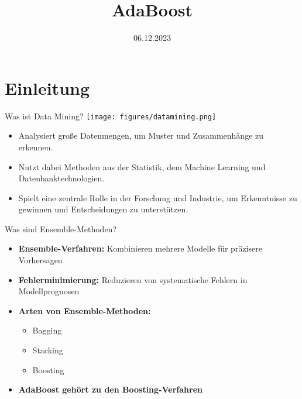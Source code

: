 \documentclass[hyperref={bookmarks=false},11pt,dvipsnames]{beamer}
\author[\presenternameshort]{\presentername}
\institute{Bergische Universität Wuppertal}
\title{AdaBoost}
\date{06.12.2023}
\def\englishlanguage{0}             %
\def\printpagenumbers{1}            %
\begin{document}
\maketitle


\let\rememberpagenumberswitch\printpagenumbers
\def\printpagenumbers{0}

\begin{frame}[t,noframenumbering]{\ifthenelse{\englishlanguage=1}{Outline}{Inhalt}}
	\tableofcontents
\end{frame}
\let\printpagenumbers\rememberpagenumberswitch


%
%

\section{Einleitung}

\begin{frame}[t]{Was ist Data Mining?}
	\texttt{[image: figures/datamining.png]}
	\begin{itemize}
		\item <1-> Analysiert große Datenmengen, um Muster und Zusammenhänge zu erkennen.
		\item <2-> Nutzt dabei Methoden aus der Statistik, dem Machine Learning und Datenbanktechnologien.
		\item <3-> Spielt eine zentrale Rolle in der Forschung und Industrie,
		      um Erkenntnisse zu gewinnen und
		      Entscheidungen zu unterstützen.
	\end{itemize}
\end{frame}
\begin{frame}[t]{Was sind Ensemble-Methoden?}
	\begin{itemize}
		\item <1-> \textbf{Ensemble-Verfahren:} Kombinieren mehrere Modelle für präzisere Vorhersagen
		\item <2-> \textbf{Fehlerminimierung:} Reduzieren von systematische Fehlern in Modellprognosen
		\item <3-> \textbf{Arten von Ensemble-Methoden:}
		      \begin{itemize}
			      \item Bagging
			      \item Stacking
			      \item Boosting
		      \end{itemize}
		\item <4-> \textbf{AdaBoost gehört zu den Boosting-Verfahren}
	\end{itemize}
\end{frame}
\end{document}
